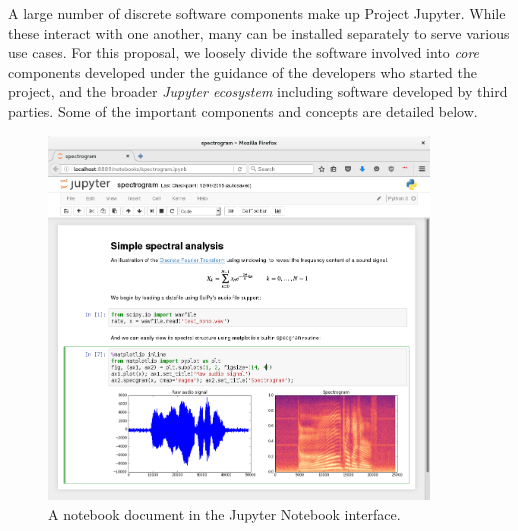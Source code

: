 A large number of discrete software components make up Project Jupyter.
While these interact with one another, many can be installed separately
to serve various use cases. For this proposal, we loosely divide the
software involved into \emph{core} components developed under the guidance
of the developers who started the project, and the broader \emph{Jupyter
ecosystem} including software developed by third parties. Some of the
important components and concepts are detailed below.

\begin{figure}[ht]\centering
  \includegraphics[width=0.9\textwidth]{spectrogram_smaller.png}
  \caption{A notebook document in the Jupyter Notebook interface.}\label{fig:notebook-screenshot}
\end{figure}

